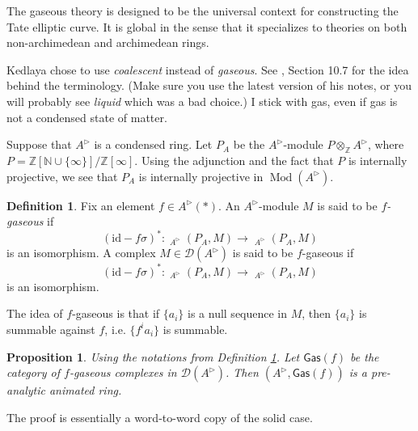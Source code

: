 \documentclass{article}
\theoremstyle{plain}
\newtheorem{prop}[thm]{Proposition}
\theoremstyle{definition}
\newtheorem{defi}[thm]{Definition}
\theoremstyle{remark}
\DeclareMathOperator{\Homs}{\underline{Hom}}
\DeclareMathOperator{\rhoms}{\underline{RHom}}
\DeclareMathOperator{\modcat}{Mod}
\newcommand{\huflag}{\triangleright}
\newcommand{\D}{\mathcal{D}}
\begin{document}
The gaseous theory is designed to be the universal context for constructing the Tate elliptic curve.
It is global in the sense that it specializes to theories on both non-archimedean and archimedean rings.

Kedlaya chose to use \emph{coalescent} instead of \emph{gaseous}.
See \cite{kedlaya}, Section 10.7 for the idea behind the terminology.
(Make sure you use the latest version of his notes, or you will probably see \emph{liquid} which was a bad choice.)
I stick with gas, even if gas is not a condensed state of matter.

Suppose that $ A ^{\huflag} $ is a condensed ring.
Let $ P _{A} $ be the $ A ^{\huflag} $-module $ P \otimes _{\mathbb{Z}} A ^{\huflag} $,
where $ P = \mathbb{Z}[\mathbb{N}\cup \{\infty\}] / \mathbb{Z}[\infty] $.
Using the adjunction and the fact that $ P $ is internally projective,
we see that $ P _{A} $ is internally projective in $ \modcat (A ^{\huflag}) $.

\begin{defi}
Fix an element $ f\in A ^{\huflag} (*) $. An $ A ^{\huflag} $-module $ M $ is said to be \emph{$ f $-gaseous} if
\begin{equation*}
(\mathrm{id} - f \sigma)^{*}: \Homs _{A ^{\huflag}}(P _{A}, M) \to \Homs _{A ^{\huflag}}(P _{A}, M)
\end{equation*}
is an isomorphism.
A complex $ M\in \D (A ^{\huflag}) $ is said to be $ f $-gaseous if
\begin{equation}
(\mathrm{id}-f \sigma)^{*}: \rhoms _{A ^{\huflag}}(P _{A}, M)\to \rhoms _{A ^{\huflag}}(P _{A}, M)
\end{equation}
is an isomorphism.
\label{gaseous::def}
\end{defi}

The idea of $ f $-gaseous is that
if $ \{a _{i}\} $ is a null sequence in $ M $, then
$ \{a _{i}\} $ is summable against $ f $, i.e. $ \{ f ^{i} a _{i}\} $ is summable.


\begin{prop}
Using the notations from Definition \ref{gaseous::def}.
Let $ \mathsf{Gas}(f) $ be the category of $ f $-gaseous complexes in $ \D (A ^{\huflag}) $.
Then $ (A ^{\huflag}, \mathsf{Gas}(f)) $ is a pre-analytic animated ring.
\end{prop}

The proof is essentially a word-to-word copy of the solid case.
\end{document}
